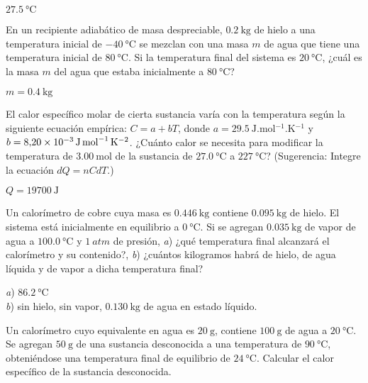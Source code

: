 \begin{Answer}
  $\SI{27.5}{\celsius}$
\end{Answer}
%
\begin{Exercise}
  En un recipiente adiabático de masa despreciable, $\SI{0.2}{\kilogram}$ de hielo a una temperatura inicial de $\SI{-40}{\celsius}$ se mezclan con una masa $m$ de agua que tiene una temperatura inicial de $\SI{80}{\celsius}$. Si la temperatura final del sistema es $\SI{20}{\celsius}$, ¿cuál es la masa $m$ del agua que estaba inicialmente a $\SI{80}{\celsius}$?
\end{Exercise}
\begin{Answer}
  $m=\SI{0.4}{\kilogram}$
\end{Answer}
%
\begin{Exercise}
  El calor específico molar de cierta sustancia varía con la temperatura según la siguiente ecuación empírica: $C = a + bT$, donde $a=\SI{29.5}{\joule.\mole^{-1}.\kelvin^{-1}}$ y $b=\SI{8.20E-3}{\joule.\mole^{-1}.\kelvin^{-2}}$. ¿Cuánto calor se necesita para modificar la temperatura de $\SI{3.00}{\mole}$ de la sustancia de $\SI{27.0}{\celsius}$ a $\SI{227}{\celsius}$? (Sugerencia: Integre la ecuación $dQ = nCdT$.)
\end{Exercise}
\begin{Answer}
  $Q=\SI{19700}{\joule}$
\end{Answer}
%
\begin{Exercise}
  Un calorímetro de cobre cuya masa es $\SI{0.446}{\kilogram}$ contiene $\SI{0.095}{\kilogram}$ de hielo. El sistema está inicialmente en equilibrio a $\SI{0}{\celsius}$. Si se agregan $\SI{0.035}{\kilogram}$ de vapor de agua a $\SI{100.0}{\celsius}$ y $\SI{1}{atm}$ de presión, \textit{a}) ¿qué temperatura final alcanzará el calorímetro y su contenido?, \textit{b}) ¿cuántos kilogramos habrá de hielo, de agua líquida y de vapor a dicha temperatura final?
\end{Exercise}
\begin{Answer}
	\begin{minipage}[t]{.4\textwidth}
    \textit{a}) $\SI{86.2}{\celsius}$\\ \textit{b}) sin hielo, sin vapor, $\SI{0.130}{\kilogram}$ de agua en estado líquido.
  \end{minipage}
\end{Answer}
%
\begin{Exercise}
  Un calorímetro cuyo equivalente en agua es $\SI{20}{\gram}$, contiene $\SI{100}{\gram}$ de agua a $\SI{20}{\celsius}$. Se agregan $\SI{50}{\gram}$ de una sustancia desconocida a una temperatura de $\SI{90}{\celsius}$, obteniéndose una temperatura final de equilibrio de $\SI{24}{\celsius}$. Calcular el calor específico de la sustancia desconocida.
\end{Exercise}
